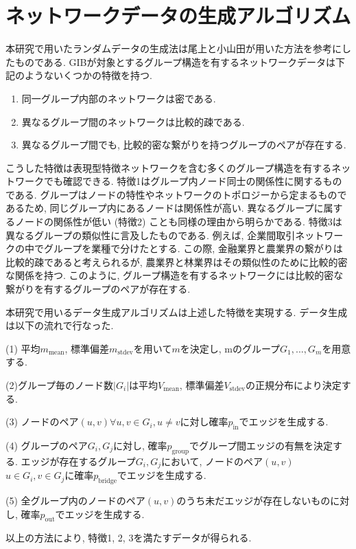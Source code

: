 \documentclass{kuee}
\begin{document}
\chapter{ネットワークデータの生成アルゴリズム}
\label{chap:data_algorithm}

本研究で用いたランダムデータの生成法は尾上と小山田が用いた方法を参考にしたものである\cite{onoue2017optimal}.
GIBが対象とするグループ構造を有するネットワークデータは下記のようないくつかの特徴を持つ.
\begin{enumerate}
  \item 同一グループ内部のネットワークは密である.
  \item 異なるグループ間のネットワークは比較的疎である.
  \item 異なるグループ間でも, 比較的密な繋がりを持つグループのペアが存在する.
\end{enumerate}
こうした特徴は表現型特徴ネットワークを含む多くのグループ構造を有するネットワークでも確認できる.
特徴1はグループ内ノード同士の関係性に関するものである.
グループはノードの特性やネットワークのトポロジーから定まるものであるため, 同じグループ内にあるノードは関係性が高い.
異なるグループに属するノードの関係性が低い (特徴2) ことも同様の理由から明らかである.
特徴3は異なるグループの類似性に言及したものである.
例えば, 企業間取引ネットワークの中でグループを業種で分けたとする.
この際, 金融業界と農業界の繋がりは比較的疎であると考えられるが, 農業界と林業界はその類似性のために比較的密な関係を持つ.
このように, グループ構造を有するネットワークには比較的密な繋がりを有するグループのペアが存在する.

本研究で用いるデータ生成アルゴリズムは上述した特徴を実現する.
データ生成は以下の流れで行なった.
\begin{description}
  \item{(1)} 平均$m_{\text{mean}}$, 標準偏差$m_{\text{stdev}}$を用いて$m$を決定し, mのグループ${G_1, ..., G_m}$を用意する.
  \item{(2)}グループ毎のノード数$|G_i|$は平均$V_{\text{mean}}$, 標準偏差$V_{\text{stdev}}$の正規分布により決定する.
  \item{(3)} ノードのペア$(u, v) \forall u,v \in G_i, u \neq v$に対し確率$p_{\text{in}}$でエッジを生成する.
  \item{(4)} グループのペア$G_i, G_j$に対し, 確率$p_{\text{group}}$でグループ間エッジの有無を決定する.
  エッジが存在するグループ$G_i, G_j$において, ノードのペア$(u, v)$\space$u \in G_i, v \in G_j$に確率$p_{\text{bridge}}$でエッジを生成する.
  \item{(5)} 全グループ内のノードのペア$(u, v)$のうち未だエッジが存在しないものに対し, 確率$p_{\text{out}}$でエッジを生成する.
\end{description}
以上の方法により, 特徴1, 2, 3を満たすデータが得られる.
\end{document}

